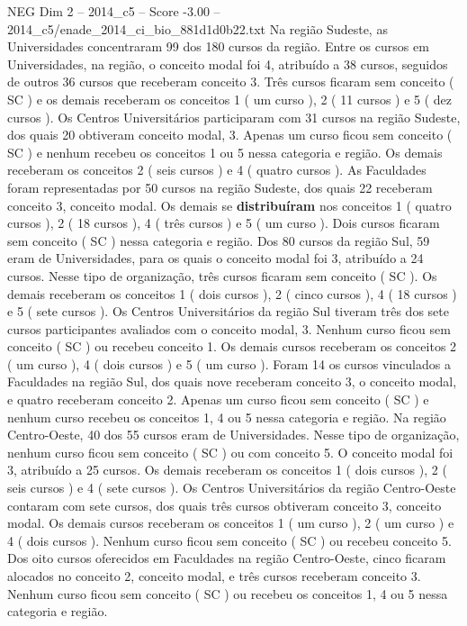 \begin{textsample}{NEG Dim 2 – 2014\_c5 – Score -3.00 – 2014\_c5/enade\_2014\_ci\_bio\_881d1d0b22.txt}
Na região Sudeste, as Universidades concentraram 99 dos 180 cursos da região.
Entre os cursos em Universidades, na região, o conceito modal foi 4, atribuído a 38 cursos, seguidos de outros 36 cursos que receberam conceito 3.
Três cursos ficaram sem conceito ( SC ) e os demais receberam os conceitos 1 ( um curso ), 2 ( 11 cursos ) e 5 ( dez cursos ).
Os Centros Universitários participaram com 31 cursos na região Sudeste, dos quais 20 obtiveram conceito modal, 3.
Apenas um curso ficou sem conceito ( SC ) e nenhum recebeu os conceitos 1 ou 5 nessa categoria e região.
Os demais receberam os conceitos 2 ( seis cursos ) e 4 ( quatro cursos ).
As Faculdades foram representadas por 50 cursos na região Sudeste, dos quais 22 receberam conceito 3, conceito modal.
Os demais se \textbf{distribuíram} nos conceitos 1 ( quatro cursos ), 2 ( 18 cursos ), 4 ( três cursos ) e 5 ( um curso ).
Dois cursos ficaram sem conceito ( SC ) nessa categoria e região.
Dos 80 cursos da região Sul, 59 eram de Universidades, para os quais o conceito modal foi 3, atribuído a 24 cursos.
Nesse tipo de organização, três cursos ficaram sem conceito ( SC ).
Os demais receberam os conceitos 1 ( dois cursos ), 2 ( cinco cursos ), 4 ( 18 cursos ) e 5 ( sete cursos ).
Os Centros Universitários da região Sul tiveram três dos sete cursos participantes avaliados com o conceito modal, 3.
Nenhum curso ficou sem conceito ( SC ) ou recebeu conceito 1.
Os demais cursos receberam os conceitos 2 ( um curso ), 4 ( dois cursos ) e 5 ( um curso ).
Foram 14 os cursos vinculados a Faculdades na região Sul, dos quais nove receberam conceito 3, o conceito modal, e quatro receberam conceito 2.
Apenas um curso ficou sem conceito ( SC ) e nenhum curso recebeu os conceitos 1, 4 ou 5 nessa categoria e região.
Na região Centro-Oeste, 40 dos 55 cursos eram de Universidades.
Nesse tipo de organização, nenhum curso ficou sem conceito ( SC ) ou com conceito 5.
O conceito modal foi 3, atribuído a 25 cursos.
Os demais receberam os conceitos 1 ( dois cursos ), 2 ( seis cursos ) e 4 ( sete cursos ).
Os Centros Universitários da região Centro-Oeste contaram com sete cursos, dos quais três cursos obtiveram conceito 3, conceito modal.
Os demais cursos receberam os conceitos 1 ( um curso ), 2 ( um curso ) e 4 ( dois cursos ).
Nenhum curso ficou sem conceito ( SC ) ou recebeu conceito 5.
Dos oito cursos oferecidos em Faculdades na região Centro-Oeste, cinco ficaram alocados no conceito 2, conceito modal, e três cursos receberam conceito 3.
Nenhum curso ficou sem conceito ( SC ) ou recebeu os conceitos 1, 4 ou 5 nessa categoria e região.

\end{textsample}
